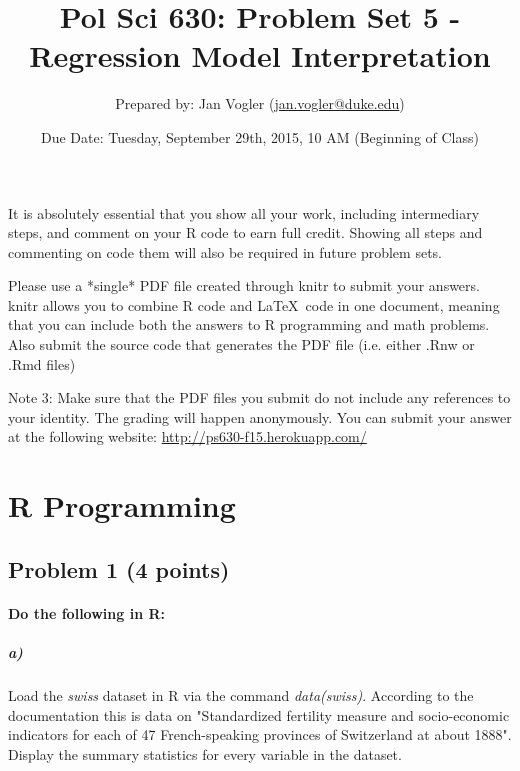 \documentclass[12pt]{article}
\begin{document}
\title{Pol Sci 630: Problem Set 5 - Regression Model Interpretation}

\author{Prepared by: Jan Vogler (\href{mailto:jan.vogler@duke.edu}{jan.vogler@duke.edu})}

\date{Due Date: Tuesday, September 29th, 2015, 10 AM (Beginning of Class)}
 
\maketitle 



It is absolutely essential that you show all your work, including intermediary steps, and comment on your R code to earn full credit. Showing all steps and commenting on code them will also be required in future problem sets.

Please use a *single* PDF file created through knitr to submit your answers. knitr allows you to combine R code and \LaTeX \ code in one document, meaning that you can include both the answers to R programming and math problems. Also submit the source code that generates the PDF file (i.e. either .Rnw or .Rmd files)

Note 3: Make sure that the PDF files you submit do not include any references to your identity. The grading will happen anonymously. You can submit your answer at the following website: \url{http://ps630-f15.herokuapp.com/}



\section*{R Programming}

\subsection*{Problem 1 (4 points)}

\paragraph{Do the following in R:}

\subparagraph{a)} Load the \textit{swiss} dataset in R via the command \textit{data(swiss)}. According to the documentation this is data on "Standardized fertility measure and socio-economic indicators for each of 47 French-speaking provinces of Switzerland at about 1888". Display the summary statistics for every variable in the dataset.
\end{document}
